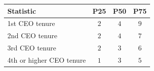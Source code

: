 \begin{tabular}{l*{3}{c}}
\hline\hline
Statistic & P25 & P50 & P75 \\
\hline
1st CEO tenure & $2$ & $4$ & $9$ \\
2nd CEO tenure & $2$ & $4$ & $7$ \\
3rd CEO tenure & $2$ & $3$ & $6$ \\
4th or higher CEO tenure & $1$ & $3$ & $5$ \\
\hline\hline
\end{tabular}
